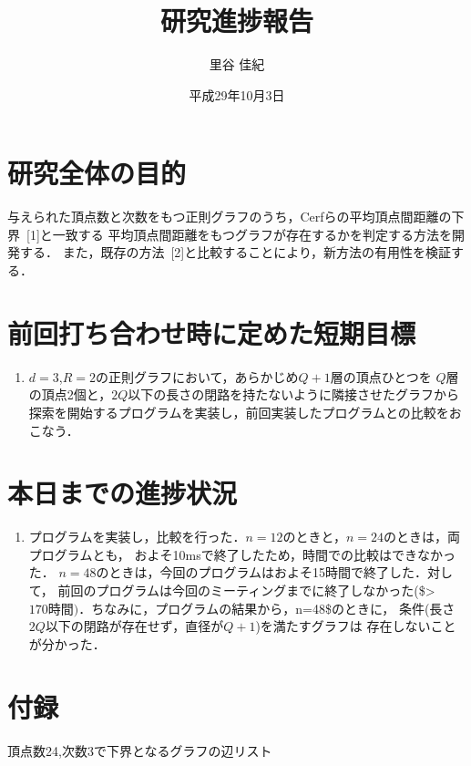 \documentclass[xelatex,ja=standard,11pt]{bxjsarticle}
\title{研究進捗報告}
\author{里谷 佳紀}
\date{平成29年10月3日}
\providecommand{\tightlist}{%
  \setlength{\itemsep}{0pt}\setlength{\parskip}{0pt}}
\begin{document}
\maketitle

\section{研究全体の目的}

与えられた頂点数と次数をもつ正則グラフのうち，Cerfらの平均頂点間距離の下界~{[}1{]}と一致する
平均頂点間距離をもつグラフが存在するかを判定する方法を開発する．
また，既存の方法~{[}2{]}と比較することにより，新方法の有用性を検証する．

\section{前回打ち合わせ時に定めた短期目標}

\begin{enumerate}
\def\labelenumi{\arabic{enumi}.}
\tightlist
\item
  \(d=3\),\(R=2\)の正則グラフにおいて，あらかじめ\(Q+1\)層の頂点ひとつを
  \(Q\)層の頂点2個と，\(2Q\)以下の長さの閉路を持たないように隣接させたグラフから
  探索を開始するプログラムを実装し，前回実装したプログラムとの比較をおこなう．
\end{enumerate}

\section{本日までの進捗状況}

\begin{enumerate}
\def\labelenumi{\arabic{enumi}.}
\tightlist
\item
  プログラムを実装し，比較を行った．\(n=12\)のときと，\(n=24\)のときは，両プログラムとも，
  およそ10msで終了したため，時間での比較はできなかった．
  \(n=48\)のときは，今回のプログラムはおよそ15時間で終了した．対して，
  前回のプログラムは今回のミーティングまでに終了しなかった(\$\textgreater{}\(170時間)． ちなみに，プログラムの結果から，\)n=48\$のときに，
  条件(長さ\(2Q\)以下の閉路が存在せず，直径が\(Q+1\))を満たすグラフは
  存在しないことが分かった．
\end{enumerate}

\section{付録}

頂点数24,次数3で下界となるグラフの辺リスト
\end{document}
